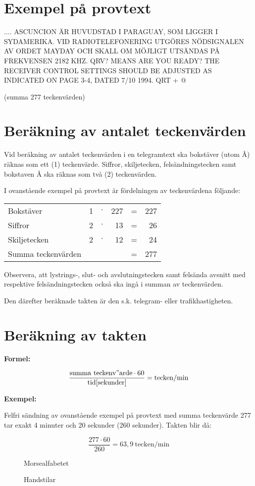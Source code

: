 \section[Provtext]{Exempel på provtext}

.... ASCUNCION ÄR HUVUDSTAD I PARAGUAY, SOM LIGGER I SYDAMERIKA.
VID RADIOTELEFONERING UTGÖRES NÖDSIGNALEN AV ORDET MAYDAY OCH SKALL OM MÖJLIGT
UTSÄNDAS PÅ FREKVENSEN 2182 KHZ.
QRV? MEANS ARE YOU READY? THE RECEIVER CONTROL SETTINGS SHOULD BE ADJUSTED AS
INDICATED ON PAGE 3-4, DATED 7/10 1994. QRT + @

(summa 277 teckenvärden)

\section[Teckenvärden]{Beräkning av antalet teckenvärden}

Vid beräkning av antalet teckenvärden i en telegramtext ska bokstäver (utom Å)
räknas som ett (1) teckenvärde.
Siffror, skiljetecken, felsändningstecken samt bokstaven Å ska räknas som två
(2) teckenvärden.

I ovanstående exempel på provtext är fördelningen av teckenvärdena följande:

\begin{tabular}{lrcrcr}
Bokstäver          & 1 & $\cdot$ & 227 & = & 227 \\
Siffror            & 2 & $\cdot$ & 13  & = & 26  \\
Skiljetecken       & 2 & $\cdot$ & 12  & = & 24  \\
Summa teckenvärden &   &         &     & = & 277
\end{tabular}

Observera, att lystrings-, slut- och avslutningstecken samt felsända avsnitt med
respektive felsändningstecken också ska ingå i summan av teckenvärden.

Den därefter beräknade takten är den s.k. telegram- eller trafikhastigheten.

\section[Taktberäkning]{Beräkning av takten}

\textbf{Formel:}

$$\frac{\mathrm{summa\ teckenv"arde }\cdot 60}{\mathrm{tid} [\mathrm{sekunder}]}
= \mathrm{tecken/min}$$

\textbf{Exempel:}

Felfri sändning av ovanstående exempel på provtext med summa teckenvärde 277
tar exakt 4 minuter och 20 sekunder (260 sekunder).
Takten blir då:

$$\frac{277 \cdot 60}{260} = 63,9\ \mathrm{tecken/min}$$

\begin{figure}
  \caption{Morsealfabetet}
  \label{fig:bild_morse_7}
\end{figure}

\begin{figure}
  \caption{Handstilar}
  \label{fig:bild_morse_8}
\end{figure}
